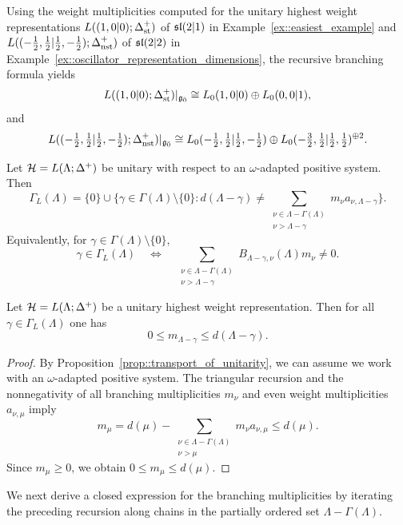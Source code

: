 \begin{example}
Using the weight multiplicities computed for the unitary highest weight
representations $L((1,0\vert 0);\Delta_{\st}^{+})$ of $\sl(2\vert 1)$ in
Example~\ref{ex::easiest_example} and
$L((-\tfrac12,\tfrac12\vert\tfrac12,-\tfrac12);\Delta_{\nst}^{+})$ of
$\sl(2\vert 2)$ in
Example~\ref{ex::oscillator_representation_dimensions}, the recursive
branching formula yields
\[
L((1,0\vert 0);\Delta_{\st}^{+})\vert_{\even}
\cong
L_{0}(1,0\vert 0)\oplus L_{0}(0,0\vert 1),
\]
and
\[
L((-\tfrac12,\tfrac12\vert\tfrac12,-\tfrac12);\Delta_{\nst}^{+})\vert_{\even}
\cong
L_{0}(-\tfrac12,\tfrac12\vert\tfrac12,-\tfrac12)
\oplus
L_{0}(-\tfrac32,\tfrac12\vert\tfrac12,\tfrac12)^{\oplus 2}.
\]
\end{example}

\begin{corollary}\label{cor::branching_support}
Let $\HH=L(\Lambda;\Delta^+)$ be unitary with respect to an $\omega$-adapted positive system. Then
\[
\Gamma_L(\Lambda)
=
\{0\}
\cup
\{
\gamma\in\Gamma(\Lambda)\setminus\{0\}:
d(\Lambda-\gamma)
\neq
\sum_{\substack{\nu\in\Lambda-\Gamma(\Lambda)\\
\nu>\Lambda-\gamma}}
m_\nu a_{\nu,\Lambda-\gamma}
\}.
\]
Equivalently, for $\gamma\in\Gamma(\Lambda)\setminus\{0\}$,
\[
\gamma\in\Gamma_L(\Lambda)
\quad\Longleftrightarrow\quad
\sum_{\substack{\nu\in\Lambda-\Gamma(\Lambda)\\
\nu>\Lambda-\gamma}}
B_{\Lambda-\gamma,\nu}(\Lambda)m_\nu\neq0.
\]
\end{corollary}

\begin{corollary}
 Let $\HH=L(\Lambda;\Delta^{+})$ be a unitary highest weight representation. Then for all $\gamma \in \Gamma_{L}(\Lambda)$ one has
 \[
 0\leq  m_{\Lambda-\gamma} \leq d(\Lambda-\gamma).
 \]
\end{corollary}
\begin{proof}
 By Proposition~\ref{prop::transport_of_unitarity}, we can assume we work with an $\omega$-adapted positive system. The triangular recursion and the nonnegativity of all branching multiplicities $m_\nu$ and even weight multiplicities $a_{\nu,\mu}$ imply
\[
m_\mu
=
d(\mu)
-
\sum_{\substack{\nu\in \Lambda-\Gamma(\Lambda)\\ \nu>\mu}}
m_\nu a_{\nu,\mu}
\leq d(\mu).
\]
Since $m_\mu\geq0$, we obtain $0\leq m_\mu\leq d(\mu)$. 
\end{proof}


We next derive a closed expression for the branching multiplicities by iterating the preceding recursion along chains in the partially ordered set $\Lambda-\Gamma(\Lambda)$.


